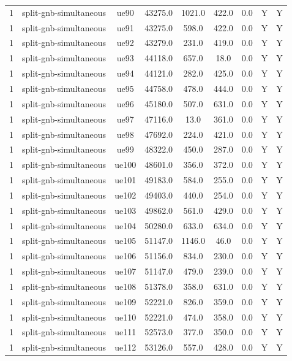 \begin{table}[ht]
\begin{tabular}{|c|c|c|c|c|c|c|c|c|}
1 & split-gnb-simultaneous & ue90 & 43275.0 & 1021.0 & 422.0 & 0.0 & Y & Y \\
1 & split-gnb-simultaneous & ue91 & 43275.0 & 598.0 & 422.0 & 0.0 & Y & Y \\
1 & split-gnb-simultaneous & ue92 & 43279.0 & 231.0 & 419.0 & 0.0 & Y & Y \\
1 & split-gnb-simultaneous & ue93 & 44118.0 & 657.0 & 18.0 & 0.0 & Y & Y \\
1 & split-gnb-simultaneous & ue94 & 44121.0 & 282.0 & 425.0 & 0.0 & Y & Y \\
1 & split-gnb-simultaneous & ue95 & 44758.0 & 478.0 & 444.0 & 0.0 & Y & Y \\
1 & split-gnb-simultaneous & ue96 & 45180.0 & 507.0 & 631.0 & 0.0 & Y & Y \\
1 & split-gnb-simultaneous & ue97 & 47116.0 & 13.0 & 361.0 & 0.0 & Y & Y \\
1 & split-gnb-simultaneous & ue98 & 47692.0 & 224.0 & 421.0 & 0.0 & Y & Y \\
1 & split-gnb-simultaneous & ue99 & 48322.0 & 450.0 & 287.0 & 0.0 & Y & Y \\
1 & split-gnb-simultaneous & ue100 & 48601.0 & 356.0 & 372.0 & 0.0 & Y & Y \\
1 & split-gnb-simultaneous & ue101 & 49183.0 & 584.0 & 255.0 & 0.0 & Y & Y \\
1 & split-gnb-simultaneous & ue102 & 49403.0 & 440.0 & 254.0 & 0.0 & Y & Y \\
1 & split-gnb-simultaneous & ue103 & 49862.0 & 561.0 & 429.0 & 0.0 & Y & Y \\
1 & split-gnb-simultaneous & ue104 & 50280.0 & 633.0 & 634.0 & 0.0 & Y & Y \\
1 & split-gnb-simultaneous & ue105 & 51147.0 & 1146.0 & 46.0 & 0.0 & Y & Y \\
1 & split-gnb-simultaneous & ue106 & 51156.0 & 834.0 & 230.0 & 0.0 & Y & Y \\
1 & split-gnb-simultaneous & ue107 & 51147.0 & 479.0 & 239.0 & 0.0 & Y & Y \\
1 & split-gnb-simultaneous & ue108 & 51378.0 & 358.0 & 631.0 & 0.0 & Y & Y \\
1 & split-gnb-simultaneous & ue109 & 52221.0 & 826.0 & 359.0 & 0.0 & Y & Y \\
1 & split-gnb-simultaneous & ue110 & 52221.0 & 474.0 & 358.0 & 0.0 & Y & Y \\
1 & split-gnb-simultaneous & ue111 & 52573.0 & 377.0 & 350.0 & 0.0 & Y & Y \\
1 & split-gnb-simultaneous & ue112 & 53126.0 & 557.0 & 428.0 & 0.0 & Y & Y \\

\end{tabular}
\end{table}
